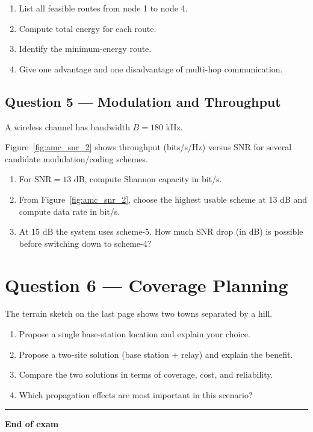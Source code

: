 \documentclass[11pt,a4paper]{article}
\begin{document}
\begin{enumerate}[label=\alph*)]
    \item List all feasible routes from node 1 to node 4.
    \item Compute total energy for each route.
    \item Identify the minimum-energy route.
    \item Give one advantage and one disadvantage of multi-hop communication.
\end{enumerate}

\subsection*{Question 5 --- Modulation and Throughput}
A wireless channel has bandwidth $B = 180$ kHz.

Figure~\ref{fig:amc_snr_2} shows throughput (bits/s/Hz) versus SNR for several candidate modulation/coding schemes.

\FloatBarrier

\begin{enumerate}[label=\alph*)]
    \item For $\mathrm{SNR}=13$ dB, compute Shannon capacity in bit/s.
    \item From Figure~\ref{fig:amc_snr_2}, choose the highest usable scheme at 13 dB and compute data rate in bit/s.
    \item At 15 dB the system uses scheme-5. How much SNR drop (in dB) is possible before switching down to scheme-4?
\end{enumerate}

\section*{Question 6 --- Coverage Planning}
The terrain sketch on the last page shows two towns separated by a hill.

\begin{enumerate}[label=\alph*)]
\item Propose a single base-station location and explain your choice.
\item Propose a two-site solution (base station + relay) and explain the benefit.
\item Compare the two solutions in terms of coverage, cost, and reliability.
\item Which propagation effects are most important in this scenario?
\end{enumerate}

\vspace{0.6cm}
\hrule
\vspace{0.3cm}
\textbf{End of exam}


\clearpage
\label{LastPage}
\end{document}
